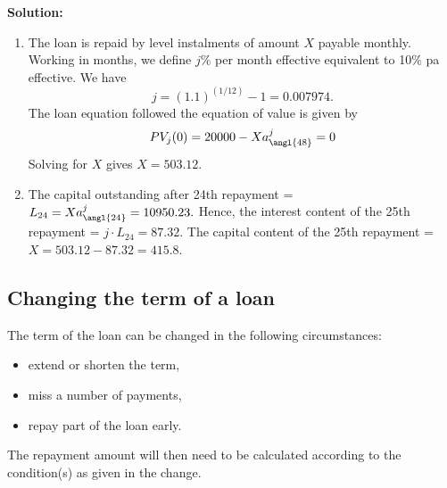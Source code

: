 \documentclass[landscape, 20pt]{extreport}
\theoremstyle{definition}
\theoremstyle{definition}
\theoremstyle{definition}
\theoremstyle{definition}
\theoremstyle{remark}
\begin{document}
\textbf{Solution:}

\begin{enumerate}
\def\labelenumi{\arabic{enumi}.}
\item
  The loan is repaid by level instalments of amount \(X\) payable
  monthly. Working in months, we define \(j\%\) per month effective
  equivalent to 10\% pa effective. We have
  \[j = (1.1)^{(1/12)} - 1 = 0.007974.\] The loan equation followed
  the equation of value is given by
  \[PV_j(0) = 20000 - X a^j_{\angl{48}} = 0\] Solving for \(X\) gives
  \(X =503.12\).
\item
  The capital outstanding after 24th repayment =
  \(L_{24} = X a^j_{\angl{24}} = 10950.23.\) Hence, the interest content
  of the 25th repayment = \(j \cdot L_{24} =87.32.\) The capital content
  of the 25th repayment = \(X =503.12 - 87.32 = 415.8.\)
\end{enumerate}

\hypertarget{changing-the-term-of-a-loan}{%
\subsection{Changing the term of a loan}\label{changing-the-term-of-a-loan}}

The term of the loan can be changed in the following circumstances:

\begin{itemize}
\item
  extend or shorten the term,
\item
  miss a number of payments,
\item
  repay part of the loan early.
\end{itemize}

The repayment amount will then need to be calculated according to the
condition(s) as given in the change.
\end{document}
